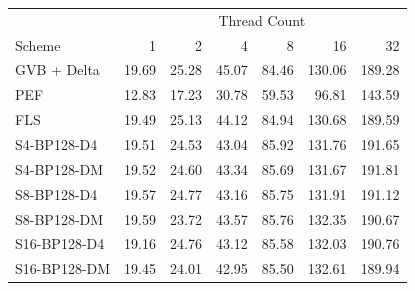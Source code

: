 \begin{tabular}{lrrrrrr}
\toprule
 & \multicolumn{6}{c}{Thread Count} \\
Scheme & 1 & 2 & 4 & 8 & 16 & 32 \\
\midrule
GVB + Delta & 19.69 & 25.28 & 45.07 & 84.46 & 130.06 & 189.28 \\
PEF & 12.83 & 17.23 & 30.78 & 59.53 & 96.81 & 143.59 \\
FLS & 19.49 & 25.13 & 44.12 & 84.94 & 130.68 & 189.59 \\
S4-BP128-D4 & 19.51 & 24.53 & 43.04 & 85.92 & 131.76 & 191.65 \\
S4-BP128-DM & 19.52 & 24.60 & 43.34 & 85.69 & 131.67 & 191.81 \\
S8-BP128-D4 & 19.57 & 24.77 & 43.16 & 85.75 & 131.91 & 191.12 \\
S8-BP128-DM & 19.59 & 23.72 & 43.57 & 85.76 & 132.35 & 190.67 \\
S16-BP128-D4 & 19.16 & 24.76 & 43.12 & 85.58 & 132.03 & 190.76 \\
S16-BP128-DM & 19.45 & 24.01 & 42.95 & 85.50 & 132.61 & 189.94 \\
\bottomrule
\end{tabular}
